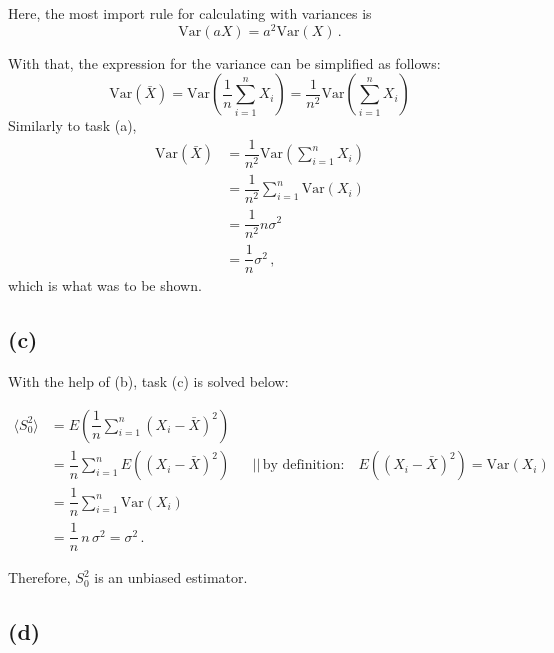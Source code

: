 Here, the most import rule for calculating with variances is
\begin{equation*}
    \text{Var}(aX) = a^2 \text{Var}(X) \,.
\end{equation*}

With that, the expression for the variance can be simplified as follows:
\begin{equation*}
    \text{Var}(\bar{X}) = \text{Var} \left(\dfrac{1}{n} \sum_{i=1}^n X_i \right) = \dfrac{1}{n^2} \text{Var} \left(\sum_{i=1}^n X_i \right)
\end{equation*}
Similarly to task (a),
\begin{align*}
    \text{Var}(\bar{X}) &= \dfrac{1}{n^2} \text{Var} \left(\sum_{i=1}^n X_i \right) \\
                        &= \dfrac{1}{n^2} \sum_{i=1}^n \text{Var}(X_i) \\
                        &= \dfrac{1}{n^2} n \sigma^2 \\
                        &= \dfrac{1}{n} \sigma^2 \,,
\end{align*}
which is what was to be shown.

\subsection*{(c)}

With the help of (b), task (c) is solved below:

\begin{align*}
    \langle S_0^2 \rangle &= E \left( \dfrac{1}{n} \sum_{i=1}^n (X_i - \bar{X})^2 \right) \\
                          &= \dfrac{1}{n} \sum_{i=1}^n E((X_i - \bar{X})^2) && \text{||} \, \text{by definition:} \quad E((X_i - \bar{X})^2) = \text{Var}(X_i) \\
                          &= \dfrac{1}{n} \sum_{i=1}^n \text{Var}(X_i) \\
                          &= \dfrac{1}{n} \, n \, \sigma^2 = \sigma^2 \,.
\end{align*}

Therefore, $S_0^2$ is an unbiased estimator.

\subsection*{(d)}




